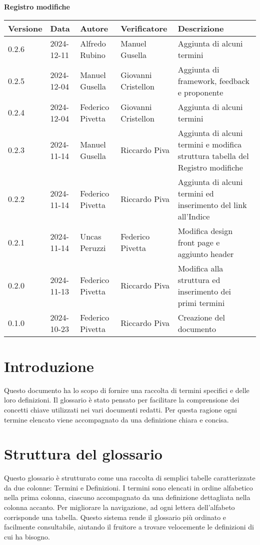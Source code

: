 \documentclass[10pt]{article}
\begin{document}
\begin{center}
\textbf{Registro modifiche}\\
\vspace{2mm}
\begin{tabularx}{\textwidth}{|l|l|l|l|X|}
\hline
\textbf{Versione} & \textbf{Data} & \textbf{Autore} & \textbf{Verificatore} & \textbf{Descrizione}\\
\hline
0.2.6 & 2024-12-11 & Alfredo Rubino & Manuel Gusella & Aggiunta di alcuni termini\\
\hline
0.2.5 & 2024-12-04 & Manuel Gusella & Giovanni Cristellon & Aggiunta di framework, feedback e proponente\\
\hline
0.2.4 & 2024-12-04 & Federico Pivetta & Giovanni Cristellon & Aggiunta di alcuni termini\\
\hline
0.2.3 & 2024-11-14  & Manuel Gusella & Riccardo Piva  & Aggiunta di alcuni termini e modifica struttura tabella del Registro modifiche\\
\hline
0.2.2 & 2024-11-14  & Federico Pivetta & Riccardo Piva  & Aggiunta di alcuni termini ed inserimento del link all'Indice\\
\hline
0.2.1 & 2024-11-14  & Uncas Peruzzi & Federico Pivetta  & Modifica design front page e aggiunto header \\
\hline
0.2.0 & 2024-11-13  & Federico Pivetta & Riccardo Piva  & Modifica alla struttura ed inserimento dei primi termini\\
\hline
0.1.0 & 2024-10-23  & Federico Pivetta & Riccardo Piva  & Creazione del documento\\
\hline

\end{tabularx}
\end{center}
\newpage
\hypertarget{indice}{}
\tableofcontents
\newpage

\section{Introduzione}
Questo documento ha lo scopo di fornire una raccolta di termini specifici e delle loro definizioni. Il glossario è stato pensato per facilitare la comprensione dei concetti chiave utilizzati nei vari documenti redatti. Per questa ragione ogni termine elencato viene accompagnato da una definizione chiara e concisa.\\

\section{Struttura del glossario}
Questo glossario è strutturato come una raccolta di semplici tabelle caratterizzate da due colonne: Termini e Definizioni. I termini sono elencati in ordine alfabetico nella prima colonna, ciascuno accompagnato da una definizione dettagliata nella colonna accanto. \newline
Per migliorare la navigazione, ad ogni lettera dell'alfabeto corrisponde una tabella. Questo sistema rende il glossario più ordinato e facilmente consultabile, aiutando il fruitore a trovare velocemente le definizioni di cui ha bisogno.\\
\end{document}
